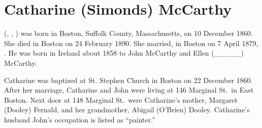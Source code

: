 \section{Catharine (Simonds) McCarthy}\label{per:Catharine4Simonds}

 (, , ) was born in Boston, Suffolk County, Massachusetts, on 10 December 1860.\cite{Catharine4SimondsBirth} She died in Boston on 24 February 1890.\cite{Catharine4SimondsDeath} She married, in Boston on 7 April 1879, .\cite{JohnMcCarthyMarriage:1} He was born in Ireland about 1858 to John McCarthy and Ellen (\_\_\_\_\_) McCarthy.\cite{JohnMcCarthyMarriage:2}

Catharine was baptized at St. Stephen Church in Boston on 22 December 1860.\cite{Catharine4SimondsBaptism} After her marriage, Catharine and John were living at 146 Marginal St.\ in East Boston. Next door at 148 Marginal St.\ were Catharine's mother, Margaret (Dooley) Fernald, and her grandmother, Abigail (O'Bri\-en) Dooley. Catharine's husband John's occupation is listed as ``painter.''\cite{Census1880Catharine4Simonds}


